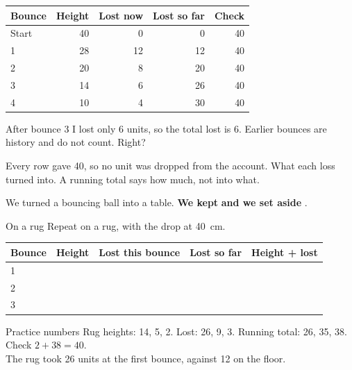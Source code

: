 \begin{center}
\sffamily\small\renewcommand{\arraystretch}{1.5}
\begin{tabular}{@{}lrrrr@{}}
\toprule
\textbf{Bounce} & \textbf{Height} & \textbf{Lost now} & \textbf{Lost so far} & \textbf{Check}\\
\midrule
Start & 40 & 0 & 0 & 40\\
1 & 28 & 12 & 12 & 40\\
2 & 20 & 8 & 20 & 40\\
3 & 14 & 6 & 26 & 40\\
4 & 10 & 4 & 30 & 40\\
\bottomrule
\end{tabular}
\end{center}

\begin{multix}[hmm]\multixbot[hmm]\tcblower
After bounce 3 I lost only 6 units, so the total lost is 6. Earlier bounces are history and do not count. Right?
\end{multix}

{Every row gave 40, so no unit was dropped from the account.}
{What each loss turned into. A running total says how much, not into what.}

\begin{keepbox}
We turned a bouncing ball into a table. \textbf{We kept} \wline[3.4cm] \textbf{and we set aside} \wline[3.4cm].
\end{keepbox}

\clearpage

\begin{tryit}{On a rug}
Repeat on a rug, with the drop at 40~cm.\par\medskip
\renewcommand{\arraystretch}{1.6}
\begin{tabular}{|l|c|c|c|c|}
\hline
\textbf{Bounce} & \textbf{Height} & \textbf{Lost this bounce} & \textbf{Lost so far} & \textbf{Height + lost}\\ \hline
1 & & & & \\ \hline
2 & & & & \\ \hline
3 & & & & \\ \hline
\end{tabular}
\end{tryit}

\begin{worked}{Practice numbers}
Rug heights: 14, 5, 2. Lost: 26, 9, 3. Running total: 26, 35, 38. Check $2+38=40$.\\
The rug took 26 units at the first bounce, against 12 on the floor.
\end{worked}

